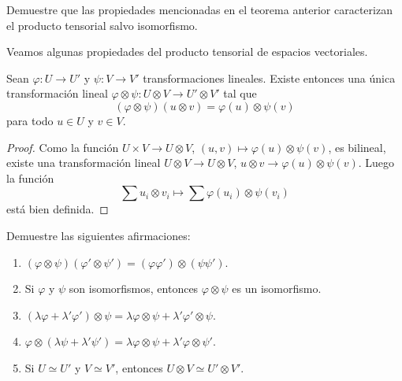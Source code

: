 \begin{exercise}
	\label{xca:tensorial_unicidad}
	Demuestre que las propiedades mencionadas en el teorema anterior
	caracterizan el producto tensorial salvo isomorfismo.
\end{exercise}

Veamos algunas propiedades del producto tensorial de espacios vectoriales. 

\begin{lemma}
	Sean $\varphi\colon U\to U'$ y $\psi\colon V\to V'$ transformaciones
	lineales. Existe entonces una única transformación lineal
	$\varphi\otimes\psi\colon U\otimes V\to U'\otimes V'$ tal que
	\[
		(\varphi\otimes\psi)(u\otimes v)=\varphi(u)\otimes\psi(v)
	\]
	para todo $u\in U$ y $v\in V$.
\end{lemma}

\begin{proof}
	Como la función $U\times V\to U\otimes V$,
	$(u,v)\mapsto\varphi(u)\otimes\psi(v)$, es bilineal, existe una
	transformación lineal $U\otimes V\to U\otimes V$, $u\otimes
	v\to\varphi(u)\otimes\psi(v)$. Luego la función
	\[
		\sum u_i\otimes v_i\mapsto\sum\varphi(u_i)\otimes\psi(v_i)
	\]
	está bien definida. 
\end{proof}

\begin{exercise}
	Demuestre las siguientes afirmaciones:
	\begin{enumerate}
		\item $(\varphi\otimes\psi)(\varphi'\otimes\psi')=(\varphi\varphi')\otimes(\psi\psi')$.
		\item Si $\varphi$ y $\psi$ son isomorfismos, entonces
			$\varphi\otimes\psi$ es un isomorfismo. 
		\item $(\lambda\varphi+\lambda'\varphi')\otimes\psi=\lambda\varphi\otimes\psi+\lambda'\varphi'\otimes\psi$.
		\item $\varphi\otimes(\lambda\psi+\lambda'\psi')=\lambda\varphi\otimes\psi+\lambda'\varphi\otimes\psi'$.
		\item Si $U\simeq U'$ y $V\simeq V'$, entonces $U\otimes V\simeq U'\otimes V'$.
	\end{enumerate}
\end{exercise}

